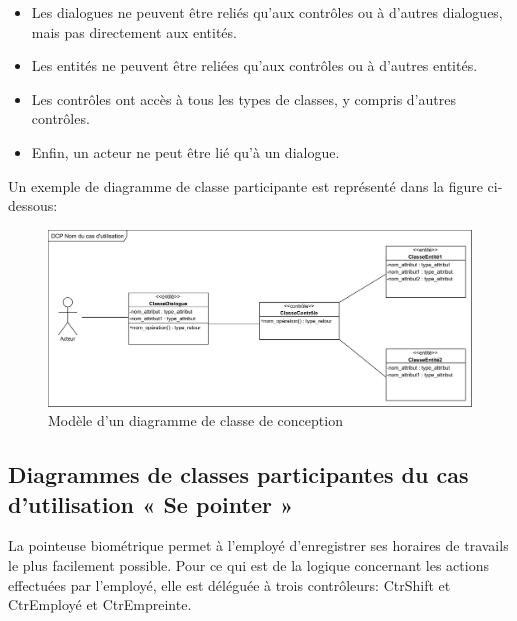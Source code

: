 \begin{itemize}
    \item[\textbullet] Les dialogues ne peuvent être reliés qu'aux contrôles ou à 
        d'autres dialogues, mais pas directement aux entités.
    \item [\textbullet] Les entités ne peuvent être reliées qu'aux contrôles ou à 
        d'autres entités.
    \item [\textbullet] Les contrôles ont accès à tous les types de classes, y 
        compris d'autres contrôles.
    \item [\textbullet] Enfin, un acteur ne peut être lié qu'à un dialogue.
\end{itemize}

Un exemple de diagramme de classe participante est représenté dans la figure 
ci-dessous:  

\begin{figure}[h!]
    \centering
    \includegraphics[scale=0.74]{images/DCP_exemple.png}
    \caption{Modèle d'un diagramme de classe de conception}
    \label{fig23}
\end{figure}

\clearpage

\subsection*{Diagrammes de classes participantes du cas d'utilisation « Se pointer »}
La pointeuse biométrique permet à l’employé d’enregistrer ses horaires de 
travails le plus facilement possible. Pour ce qui est de la logique concernant 
les actions effectuées par l’employé, elle est déléguée à trois contrôleurs: 
CtrShift et CtrEmployé et CtrEmpreinte.
            

